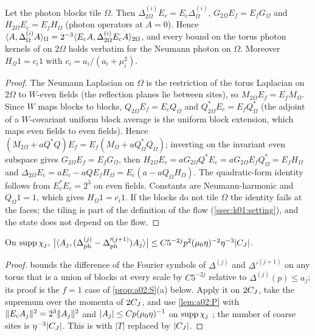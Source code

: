 \begin{lemma}\label{lem:a02:P}
Let the photon blocks tile $\Omega$. Then $\Delta^{(i)}_{2\Omega}E_c=E_c\Delta^{(i)}_\Omega$, $G_{2\Omega}E_f=E_fG_\Omega$ and $H_{2\Omega}E_c=E_fH_\Omega$ (photon operators at $A=0$). Hence $\langle A,\Delta^{(i)}_\Omega A\rangle_\Omega=2^{-3}\langle E_cA,\Delta^{(i)}_{2\Omega}E_cA\rangle_{2\Omega}$, and every bound on the torus photon kernels of \cite[Thm.~3.3, Props.~3.8, 3.10]{K1} on $2\Omega$ holds verbatim for the Neumann photon on $\Omega$. Moreover $H_\Omega1=c_i1$ with $c_i=a_i/(a_i+\mu_i^2)$.
\end{lemma}
\begin{proof}
The Neumann Laplacian on $\Omega$ is the restriction of the torus Laplacian on $2\Omega$ to $W$-even fields (the reflection planes lie between sites), so $M_{2\Omega}E_f=E_fM_\Omega$. Since $W$ maps blocks to blocks, $Q_{2\Omega}E_f=E_cQ_\Omega$ and $Q_{2\Omega}^*E_c=E_fQ_\Omega^*$ (the adjoint of a $W$-covariant uniform block average is the uniform block extension, which maps even fields to even fields). Hence $(M_{2\Omega}+aQ^*Q)E_f=E_f(M_\Omega+aQ^*_\Omega Q_\Omega)$; inverting on the invariant even subspace gives $G_{2\Omega}E_f=E_fG_\Omega$, then $H_{2\Omega}E_c=aG_{2\Omega}Q^*E_c=aG_{2\Omega}E_fQ_\Omega^*=E_fH_\Omega$ and $\Delta_{2\Omega}E_c=aE_c-aQE_fH_\Omega=E_c(a-aQ_\Omega H_\Omega)$. The quadratic-form identity follows from $E_c^*E_c=2^3$ on even fields. Constants are Neumann-harmonic and $Q_\Omega1=1$, which gives $H_\Omega1=c_i1$. If the blocks do not tile $\Omega$ the identity fails at the faces; the tiling is part of the definition of the flow (\cref{ssec:k01:setting}), and the state does not depend on the flow.
\end{proof}

\begin{proposition}[(B1)]\label{prop:a02:B1}
On $\operatorname{supp}\chi_j$, $\big|\langle A_j,(\Delta^{(j)}_{\mathrm{ph}}-\Delta'^{(j+1)}_{\mathrm{ph}})A_j\rangle\big|\le C5^{-2j}p^2(\mu_0\eta)^{-2}\eta^{-3}|C_J|$.
\end{proposition}
\begin{proof}
\cite[Prop.~3.10]{K1} bounds the difference of the Fourier symbols of $\Delta^{(j)}$ and $\Delta'^{(j+1)}$ on any torus that is a union of blocks at every scale by $C5^{-2j}$ relative to $\Delta^{(j)}(p)\le a_j$; its proof \cite[Sect.~4, Lemma 4.2]{K1} is the $f=1$ case of \cref{prop:a02:S}(a) below. Apply it on $2C_J$, take the supremum over the momenta of $2C_J$, and use \cref{lem:a02:P} with $\lVert E_cA_j\rVert^2=2^3\lVert A_j\rVert^2$ and $|A_j|\le Cp(\mu_0\eta)^{-1}$ on $\operatorname{supp}\chi_j$ \cite[(3.2)]{K1}; the number of coarse sites is $\eta^{-3}|C_J|$. This is \cite[(3.92)]{K1} with $|T|$ replaced by $|C_J|$.
\end{proof}

